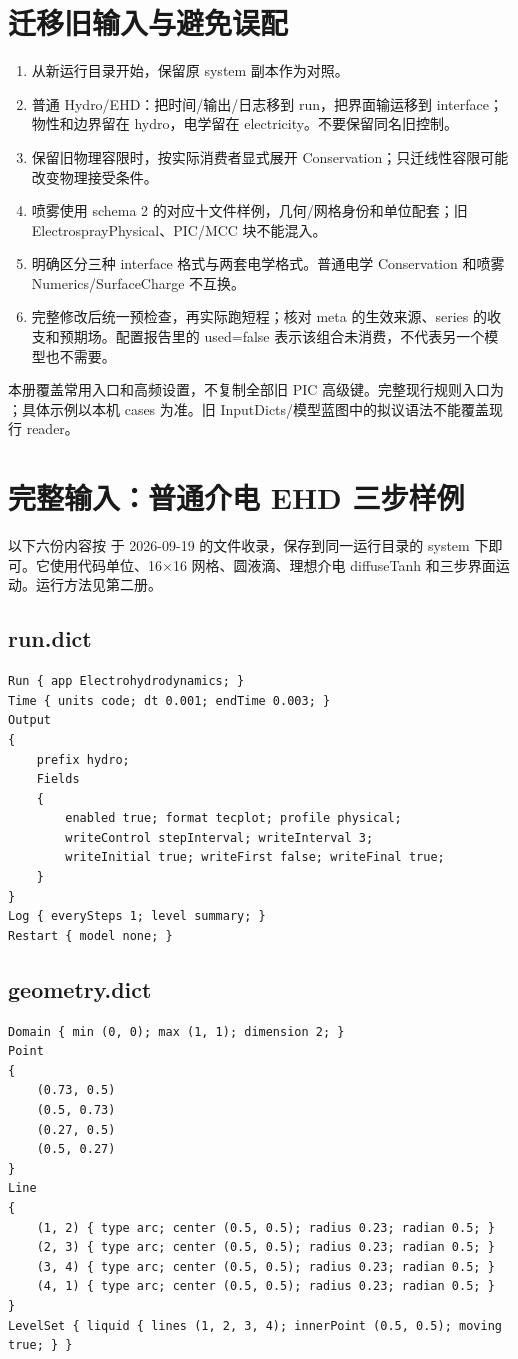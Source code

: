 \documentclass[a4paper,11pt]{article}
\begin{document}
\section{迁移旧输入与避免误配}
\begin{enumerate}
\item 从新运行目录开始，保留原 system 副本作为对照。
\item 普通 Hydro/EHD：把时间/输出/日志移到 run，把界面输运移到 interface；物性和边界留在 hydro，电学留在 electricity。不要保留同名旧控制。
\item 保留旧物理容限时，按实际消费者显式展开 Conservation；只迁线性容限可能改变物理接受条件。
\item 喷雾使用 schema 2 的对应十文件样例，几何/网格身份和单位配套；旧 ElectrosprayPhysical、PIC/MCC 块不能混入。
\item 明确区分三种 interface 格式与两套电学格式。普通电学 Conservation 和喷雾 Numerics/SurfaceCharge 不互换。
\item 完整修改后统一预检查，再实际跑短程；核对 meta 的生效来源、series 的收支和预期场。配置报告里的 used=false 表示该组合未消费，不代表另一个模型也不需要。
\end{enumerate}
本册覆盖常用入口和高频设置，不复制全部旧 PIC 高级键。完整现行规则入口为 ；具体示例以本机 cases 为准。旧 InputDicts/模型蓝图中的拟议语法不能覆盖现行 reader。

\appendix
\clearpage
\section{完整输入：普通介电 EHD 三步样例}
以下六份内容按  于 2026-09-19 的文件收录，保存到同一运行目录的 system 下即可。它使用代码单位、16$\times$16 网格、圆液滴、理想介电 diffuseTanh 和三步界面运动。运行方法见第二册。
\subsection{run.dict}
\begin{lstlisting}
Run { app Electrohydrodynamics; }
Time { units code; dt 0.001; endTime 0.003; }
Output
{
    prefix hydro;
    Fields
    {
        enabled true; format tecplot; profile physical;
        writeControl stepInterval; writeInterval 3;
        writeInitial true; writeFirst false; writeFinal true;
    }
}
Log { everySteps 1; level summary; }
Restart { model none; }
\end{lstlisting}
\subsection{geometry.dict}
\begin{lstlisting}
Domain { min (0, 0); max (1, 1); dimension 2; }
Point
{
    (0.73, 0.5)
    (0.5, 0.73)
    (0.27, 0.5)
    (0.5, 0.27)
}
Line
{
    (1, 2) { type arc; center (0.5, 0.5); radius 0.23; radian 0.5; }
    (2, 3) { type arc; center (0.5, 0.5); radius 0.23; radian 0.5; }
    (3, 4) { type arc; center (0.5, 0.5); radius 0.23; radian 0.5; }
    (4, 1) { type arc; center (0.5, 0.5); radius 0.23; radian 0.5; }
}
LevelSet { liquid { lines (1, 2, 3, 4); innerPoint (0.5, 0.5); moving true; } }
\end{lstlisting}
\end{document}
